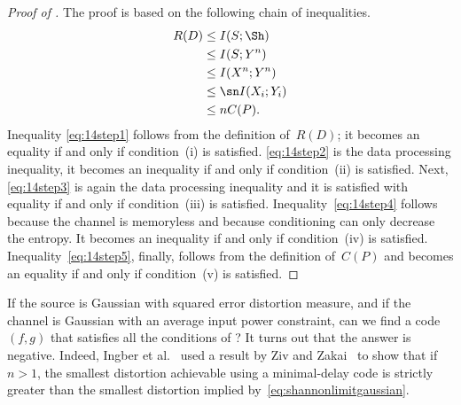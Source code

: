 \begin{proof}[Proof of ]
  The proof is based on the following chain of inequalities.
  \begin{align}
    \label{eq:14step1}
    R(D) &\le I(S; \Sh) \\
    \label{eq:14step2}
    &\le I(S; Y^n) \\
    \label{eq:14step3}
    &\le I(X^n; Y^n) \\
    \label{eq:14step4}
    &\le \sn I(X_i; Y_i)  \\
    \label{eq:14step5}
    &\le n C(P).
  \end{align}
  Inequality \eqref{eq:14step1} follows from the definition of~$R(D)$; it
  becomes an equality if and only if condition~(i) is satisfied.
  \eqref{eq:14step2} is the data processing inequality, it becomes an inequality
  if and only if condition~(ii) is satisfied. Next, \eqref{eq:14step3} is again
  the data processing inequality and it is satisfied with equality if and only
  if condition~(iii) is satisfied.  Inequality~\eqref{eq:14step4} follows
  because the channel is memoryless and because conditioning can only decrease
  the entropy. It becomes an inequality if and only if condition~(iv) is
  satisfied. Inequality~\eqref{eq:14step5}, finally, follows from the definition
  of~$C(P)$ and becomes an equality if and only if condition~(v) is satisfied.
\end{proof}

If the source is Gaussian with squared error distortion measure, and if the
channel is Gaussian with an average input power constraint, can we find a code
$(f,g)$ that satisfies all the conditions of ? It turns out that
the answer is negative. Indeed, Ingber et al.~\cite{IngberLZF2008} used a result
by Ziv and Zakai~\cite{ZivZ1973} to show that if $n>1$, the smallest distortion
achievable using a minimal-delay code is strictly greater than the smallest
distortion implied by~\eqref{eq:shannonlimitgaussian}.
